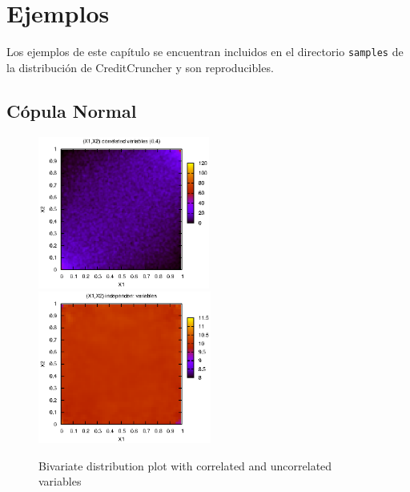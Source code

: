 
%
%
%
%
%
%
%
%

\chapter{Ejemplos}
\label{sec:examples}

Los ejemplos de este cap\'itulo se encuentran incluidos en el directorio
\verb+samples+ de la distribuci\'on de CreditCruncher y son reproducibles.

\section{C\'opula Normal}

\begin{figure}[!hb]
\begin{center}
\includegraphics[height=5cm, angle=0]{./images/copula.eps}
\includegraphics[height=5cm, angle=0]{./images/uniform.eps}
\caption{Bivariate distribution plot with correlated and uncorrelated variables}
\label{copulas}
\end{center}
\end{figure}


